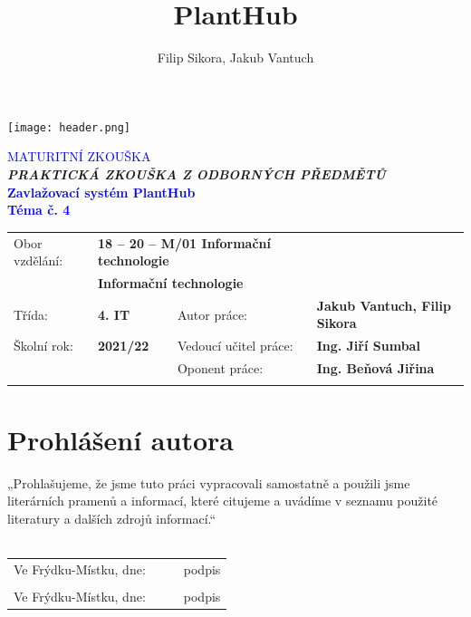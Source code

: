 \documentclass[czech,12pt,a4paper]{article}
\title{PlantHub}
\author{Filip Sikora, Jakub Vantuch}
\date{}
\newcommand\blankpage{
    \null
    \thispagestyle{empty}
    \addtocounter{page}{-1}
    \newpage}
\begin{document}
\renewcommand*\listfigurename{}
\renewcommand{\figurename}{Obr.}
\renewcommand\refname{}

\afterpage{\blankpage}
\begin{titlepage}
	\vspace*{-1.75cm}
	\noindent\texttt{[image: header.png]}
	\begin{center}
		\vspace*{4.5cm}
		{\fontsize{19}{20}\selectfont\textcolor{blue}{MATURITNÍ ZKOUŠKA}}
		\vspace*{7mm} \\
		\textbf{\emph{PRAKTICKÁ ZKOUŠKA Z ODBORNÝCH PŘEDMĚTŮ}}
		\vspace*{5.9cm} \\
		{\fontsize{16}{20}\selectfont\textbf{\textcolor{blue}{Zavlažovací systém PlantHub}}} \\
		\vspace*{6mm}
		{\fontsize{16}{20}\selectfont\textbf{\textcolor{blue}{Téma č. 4}}} \\
		\normalsize
	\end{center}
	\vspace*{\fill}
	\renewcommand{\arraystretch}{0.5}
	\begin{tabularx}{\textwidth}{lX@{\hskip 0.75cm}ll}
		Obor vzdělání: & \multicolumn{2}{l}{\textbf{18 – 20 – M/01 Informační technologie}} \\[10pt]
		& \multicolumn{2}{l}{\textbf{Informační technologie}} \\[10pt]
		Třída: & \textbf{4. IT} & Autor práce: & \textbf{Jakub Vantuch, Filip Sikora} \\[10pt]
		Školní rok: & \textbf{2021/22} & Vedoucí učitel práce: & \textbf{Ing. Jiří Sumbal} \\[10pt]
		& & Oponent práce: & \textbf{Ing. Beňová Jiřina} \\[10pt]
		\vspace*{1cm}
	\end{tabularx}
\end{titlepage}

\clearpage

\section*{Prohlášení autora}

\vspace*{\fill}

„Prohlašujeme, že jsme tuto práci vypracovali samostatně a použili jsme literárních pramenů a informací, které citujeme a uvádíme v seznamu použité literatury a dalších zdrojů informací.“ \\
\vspace*{0.5cm} \\
\begin{tabularx}{\textwidth}{l@{\hskip 0.75cm}X@{\hskip 1.5cm}X@{\hskip 0.75cm}l}
	Ve Frýdku-Místku, dne: & \dotfill & \dotfill & podpis \\
	& & & \\
	Ve Frýdku-Místku, dne: & \dotfill & \dotfill & podpis \\
\end{tabularx}
\end{document}
